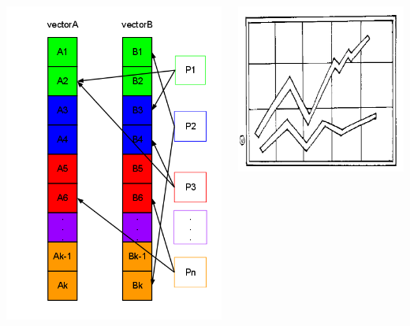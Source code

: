 \documentclass[final]{beamer}
\begin{document}
\begin{frame}[t]
\begin{columns}[t]
\begin{column}{0.60\paperwidth}
\begin{columns}[t,totalwidth=0.60\paperwidth]
\begin{column}{0.10\paperwidth}
\begin{columns}[t,totalwidth=0.10\paperwidth]
\begin{column}{0.10\paperwidth}
								\includegraphics[width=0.09\paperwidth]{img/rand_access}
							\end{column}
						\end{columns}
					\end{column}
					\begin{column}{0.22\paperwidth}
						\begin{columns}[t,totalwidth=0.22\paperwidth]
							\begin{column}{0.22\paperwidth}
								\includegraphics[width=0.22\paperwidth]{img/temp}

\end{column}
\end{columns}
\end{column}
\end{columns}
\end{column}
\end{columns}
\end{frame}
\end{document}
